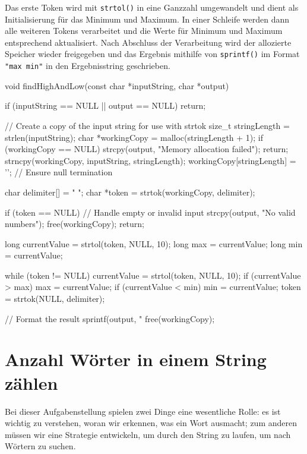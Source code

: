 Das erste Token wird mit \texttt{strtol()} in eine Ganzzahl umgewandelt
und dient als Initialisierung für das Minimum und Maximum. In einer Schleife
werden dann alle weiteren Tokens verarbeitet und die Werte für Minimum und
Maximum entsprechend aktualisiert. Nach Abschluss der Verarbeitung wird der
allozierte Speicher wieder freigegeben und das Ergebnis mithilfe von
\texttt{sprintf()} im Format \texttt{"max min"} in den
Ergebnisstring geschrieben.

\begin{codebox}[lang=c, fontsize=\small]
void findHighAndLow(const char *inputString, char *output) {
    if (inputString == NULL || output == NULL) {
        return;
    }

    // Create a copy of the input string for use with strtok
    size_t stringLength = strlen(inputString);
    char *workingCopy = malloc(stringLength + 1);
    if (workingCopy == NULL) {
        strcpy(output, "Memory allocation failed");
        return;
    }
    strncpy(workingCopy, inputString, stringLength);
    workingCopy[stringLength] = '\0'; // Ensure null termination

    char delimiter[] = " ";
    char *token = strtok(workingCopy, delimiter);

    if (token == NULL) {
        // Handle empty or invalid input
        strcpy(output, "No valid numbers");
        free(workingCopy);
        return;
    }

    long currentValue = strtol(token, NULL, 10);
    long max = currentValue;
    long min = currentValue;

    while (token != NULL) {
        currentValue = strtol(token, NULL, 10);
        if (currentValue > max) {
            max = currentValue;
        }
        if (currentValue < min) {
            min = currentValue;
        }
        token = strtok(NULL, delimiter);
    }

    // Format the result
    sprintf(output, "%
    free(workingCopy);
}
\end{codebox}




\chapter{Anzahl Wörter in einem String zählen}

Bei dieser Aufgabenstellung spielen zwei Dinge eine wesentliche Rolle: es ist
wichtig zu verstehen, woran wir erkennen, was ein Wort ausmacht; zum anderen
müssen wir eine Strategie entwickeln, um durch den String zu laufen, um nach
Wörtern zu suchen.

